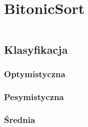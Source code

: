 

\section{BitonicSort}
\begin{equation}
\end{equation}
\subsection{Klasyfikacja}
\subsubsection{Optymistyczna}

\subsubsection{Pesymistyczna}

\subsubsection{Średnia}


